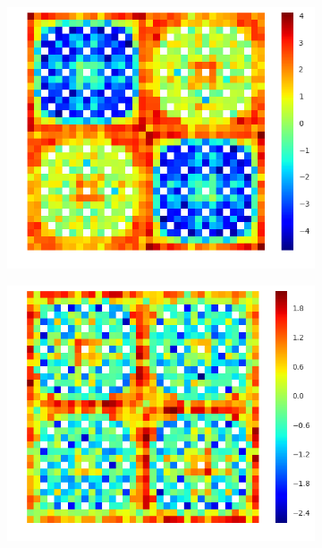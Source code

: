 \begin{figure}[h!]
\centering
\begin{subfigure}{.33\textwidth}
  \centering
  \includegraphics[width=\linewidth]{figures/quantification/2x2/infinite-capt-err-2}
  \caption{}
  \label{fig:chap8-2x2-inf-capt-2}
\end{subfigure}%
\begin{subfigure}{.33\textwidth}
  \centering
  \includegraphics[width=\linewidth]{figures/quantification/2x2/infinite-capt-err-8}
  \caption{}
  \label{fig:chap8-2x2-inf-capt-8}

\end{subfigure}
\end{figure}
